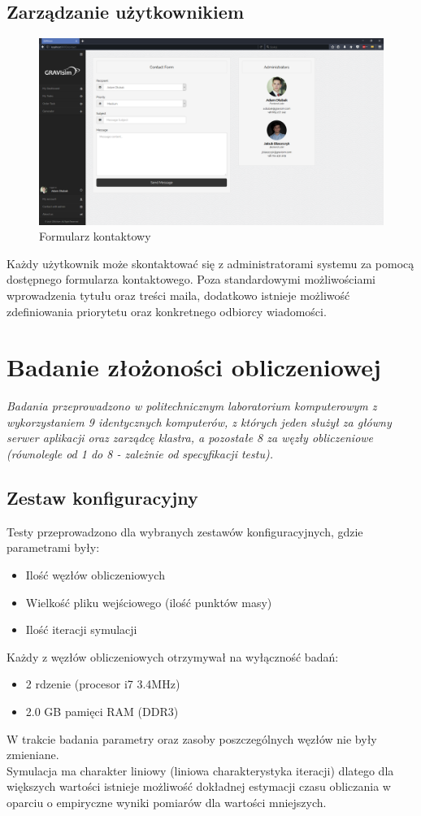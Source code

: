 \documentclass[a4paper,onecolumn,oneside,12pt]{memoir}
\begin{document}
{{\section{Zarządzanie użytkownikiem}
\begin{figure}[h!]
	\centering
	\includegraphics[width=0.9\linewidth]{pictures/screen-7}
	\caption{Formularz kontaktowy}
\end{figure}
Każdy użytkownik może skontaktować się z administratorami systemu za pomocą dostępnego formularza kontaktowego. Poza standardowymi możliwościami wprowadzenia tytułu oraz treści maila, dodatkowo istnieje możliwość zdefiniowania priorytetu oraz konkretnego odbiorcy wiadomości.




\chapter{Badanie złożoności obliczeniowej}
\emph{Badania przeprowadzono w politechnicznym laboratorium komputerowym z wykorzystaniem 9 identycznych komputerów, z których jeden służył za główny serwer aplikacji oraz zarządcę klastra, a pozostałe 8 za węzły obliczeniowe (równolegle od 1 do 8 - zależnie od specyfikacji testu).}

\section{Zestaw konfiguracyjny}

Testy przeprowadzono dla wybranych zestawów konfiguracyjnych, gdzie parametrami były:
\begin{itemize}
\item Ilość węzłów obliczeniowych
\item Wielkość pliku wejściowego (ilość punktów masy)
\item Ilość iteracji symulacji
\end{itemize}
Każdy z węzłów obliczeniowych otrzymywał na wyłączność badań:
\begin{itemize}
\item 2 rdzenie (procesor i7 3.4MHz)
\item 2.0 GB pamięci RAM (DDR3)
\end{itemize}
W trakcie badania parametry oraz zasoby poszczególnych węzłów nie były zmieniane.\\
Symulacja ma charakter liniowy (liniowa charakterystyka iteracji) dlatego dla większych wartości istnieje możliwość dokładnej estymacji czasu obliczania w oparciu o empiryczne wyniki pomiarów dla wartości mniejszych.

}}
\end{document}
